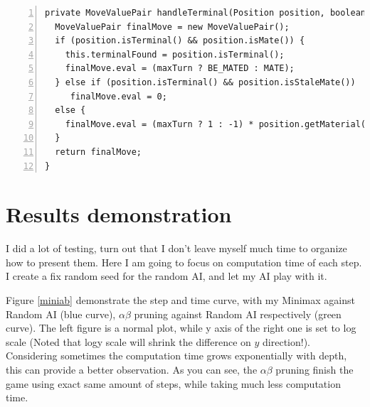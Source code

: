 \documentclass{article}
\begin{document}
\begin{lstlisting}[numbers=left]
private MoveValuePair handleTerminal(Position position, boolean maxTurn) {
  MoveValuePair finalMove = new MoveValuePair();
  if (position.isTerminal() && position.isMate()) {
    this.terminalFound = position.isTerminal();
    finalMove.eval = (maxTurn ? BE_MATED : MATE);
  } else if (position.isTerminal() && position.isStaleMate())
     finalMove.eval = 0;
  else {
    finalMove.eval = (maxTurn ? 1 : -1) * position.getMaterial();
  }
  return finalMove;
}
\end{lstlisting}





























\clearpage
\section{Results demonstration}


I did a lot of testing, turn out that I don't leave myself much time to organize how to present them. Here I am going to focus on computation time of each step. I create a fix random seed for the random AI, and let my AI play with it. 

Figure \ref{miniab} demonstrate the step and time curve, with my Minimax against Random AI (blue curve),  $\alpha\beta$ pruning against Random AI respectively (green curve). The left figure is a normal plot, while y axis of the right one is set to log scale (Noted that logy scale will shrink the difference on $y$ direction!). Considering sometimes the computation time grows exponentially with depth, this can provide a better observation. As you can see, the $\alpha\beta$ pruning finish the game using exact same amount of steps, while taking much less computation time.
\end{document}

